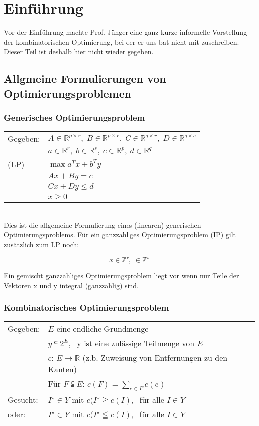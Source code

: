 \documentclass[12pt,titlepage,a4paper] {report}
\newcommand{\RR}{\mathbb{R}}
\newcommand{\ZZ}{\mathbb{Z}}
\begin{document}


\setcounter{chapter}{-1}

\chapter{Einführung}

\newtheorem{satz}{Satz}[chapter]
\newtheorem{lemma}{Lemma}[chapter]

Vor der Einführung machte Prof. Jünger eine ganz kurze informelle 
Vorstellung der kombinatorischen Optimierung, bei der er uns bat nicht 
mit zuschreiben. Dieser Teil ist deshalb hier nicht wieder gegeben. 

\section{Allgmeine Formulierungen von Optimierungsproblemen}

\subsection{Generisches Optimierungsproblem}
\begin{tabular}{ll}
Gegeben: & $ A \in \RR^{p \times r},\;  B \in \RR^{p\times r},\; 
C \in \RR^{q\times r}, \; D \in \RR^{q\times s} $\\
& $a \in \RR^{r}, \; b \in \RR^{s}, \; c \in \RR^{p},\; d \in \RR^{q}$\\
(LP)&$\max a^{T}x + b^{T}y$\\
&$Ax+ By = c$\\
&$Cx+Dy \leq d$\\
&$x \geq 0$\\
\end{tabular}\\

Dies ist die allgemeine Formulierung eines (linearen) generischen
Optimierungsproblems. Für ein ganzzahliges Optimierungsproblem (IP) gilt
zusätzlich zum LP noch:

\[x \in \ZZ^{r}, \; \in \ZZ^{s} \]

Ein gemischt ganzzahliges Optimierungsproblem liegt vor wenn nur Teile
der Vektoren x und y integral (ganzzahlig) sind.


\subsection{Kombinatorisches Optimierungsproblem}

\begin{tabular}{ll}
Gegeben:& $E$ eine endliche Grundmenge\\
&$y \subseteqq 2^{E},\;$ y ist eine zulässige Teilmenge von $E$\\
&$c$: $E \rightarrow \RR$ (z.b. Zuweisung von Entfernungen zu den
Kanten)\\
&Für $F \subseteqq E$: $c(F) = \sum_{e\in F} c(e)$\\
Gesucht:& $I^{\star} \in Y$ mit $c(I^{\star} \geqq c(I),\;$ für alle $I \in
Y$\\
\hspace{3mm} oder:&$I^{\star} \in Y$ mit $c(I^{\star} \leqq c(I),\;$ für
alle $I \in Y$
\end{tabular}
\end{document}
